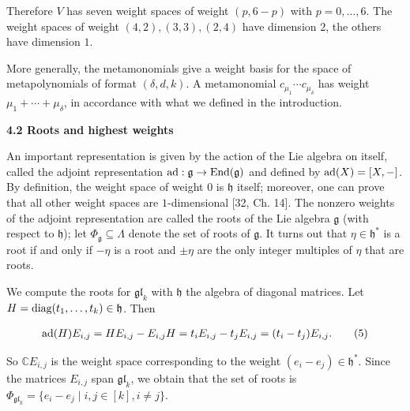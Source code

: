 \documentclass[10pt,a4paper]{article}
\begin{document}
Therefore $V$ has seven weight spaces of weight $(p,6-p)$ with $p=0,\ldots,6$. The weight spaces of weight $(4,2),(3,3),(2,4)$ have dimension $2$, the others have dimension $1$.





More generally, the metamonomials give a weight basis for the space of metapolynomials of format $(\delta,d,k)$. A metamonomial $c_{\mu_{1}}\cdots c_{\mu_{\delta}}$ has weight $\mu_{1}+\cdots+\mu_{\delta}$,
in accordance with what we defined in the introduction.








\par\medskip\noindent\textbf{4.2 Roots and highest weights}\par




An important representation is given by the action of the Lie algebra on itself, called the adjoint representation $\textnormal{ad}:\mathfrak{g}\to\textnormal{End}(\mathfrak{g})$ and defined by $\textnormal{ad}(X)=[X,-]$.
By definition, the weight space of weight $0$ is $\mathfrak{h}$ itself; moreover, one can prove that all other weight spaces are $1$-dimensional [32, Ch. 14]. The nonzero weights of the adjoint representation are called the roots of the Lie algebra $\mathfrak{g}$ (with respect to $\mathfrak{h}$); let $\Phi_{\mathfrak{g}}\subseteq\Lambda$ denote the set of roots of $\mathfrak{g}$. It turns out that $\eta\in\mathfrak{h}^{*}$ is a root if and only if $-\eta$ is a root and $\pm\eta$ are the only integer multiples of $\eta$ that are roots.





We compute the roots for $\mathfrak{gl}_{k}$ with $\mathfrak{h}$ the algebra of diagonal matrices. Let $H=\textnormal{diag}(t_{1},\ldots,t_{k})\in\mathfrak{h}$. Then



\[\begin{aligned}
\displaystyle\textnormal{ad}(H)E_{i,j}=HE_{i,j}-E_{i,j}H=t_{i}E_{i,j}-t_{j}E_{i,j}=(t_{i}-t_{j})E_{i,j}.\qquad\text{(5)}
\end{aligned}\]


So $\mathbb{C}E_{i,j}$ is the weight space corresponding to the weight $(e_{i}-e_{j})\in\mathfrak{h}^{*}$. Since the matrices $E_{i,j}$ span $\mathfrak{gl}_{k}$, we obtain that the set of roots is $\Phi_{\mathfrak{gl}_{k}}=\{e_{i}-e_{j}\mid i,j\in[k],i\neq j\}$.
\end{document}
